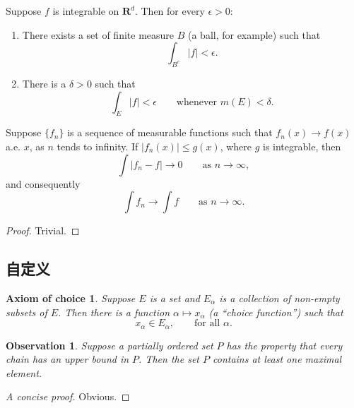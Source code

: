 \begin{proposition}
	Suppose $f$ is integrable on $\mathbf{R}^d$. Then for every $\epsilon > 0$:
	\begin{enumerate}
		\renewcommand{\theenumi}{\roman{enumi}}
		\item There exists a set of finite measure $B$ (a ball, for example) such that
		\begin{equation}
		\int_{B^c} |f| < \epsilon.
		\end{equation}
		\item There is a $\delta > 0$ such that
		\begin{equation}
		\int_E |f| < \epsilon \qquad \text{whenever } m(E) < \delta.
		\end{equation}
	\end{enumerate}
\end{proposition}

\begin{theorem}
	Suppose $\{f_n\}$ is a sequence of measurable functions such that
	$f_n(x) \to f(x)$ a.e. $x$, as $n$ tends to infinity.
	If $|f_n(x)| \leq g(x)$, where $g$ is integrable, then
	\begin{equation}
	\int |f_n - f| \to 0 \qquad \text{as } n \to \infty,
	\end{equation}
	and consequently
	\begin{equation}
	\int f_n \to \int f \qquad \text{as } n \to \infty.
	\end{equation}
\end{theorem}

\begin{proof}
	Trivial.
\end{proof}


\subsection{自定义}

\newtheorem*{axiomofchoice}{Axiom of choice}
\begin{axiomofchoice}
	Suppose $E$ is a set and ${E_\alpha}$ is a collection of
	non-empty subsets of $E$. Then there is a function $\alpha
	\mapsto x_\alpha$ (a ``choice function'') such that
	\begin{equation}
	x_\alpha \in E_\alpha,\qquad \text{for all }\alpha.
	\end{equation}
\end{axiomofchoice}

\newtheorem{observation}{Observation}[chapter]
\begin{observation}
	Suppose a partially ordered set $P$ has the property
	that every chain has an upper bound in $P$. Then the
	set $P$ contains at least one maximal element.
\end{observation}
\begin{proof}[A concise proof]
	Obvious.
\end{proof}

